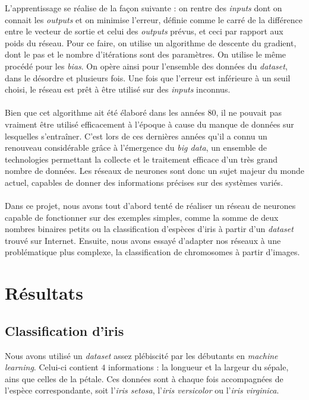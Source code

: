 \documentclass[a4paper,10pt]{article}
\begin{document}
L'apprentissage se réalise de la façon suivante : on rentre des \textit{inputs} dont on connait les \textit{outputs} et on minimise
l'erreur, définie comme le carré de la différence entre le vecteur de sortie et celui des \textit{outputs} prévus, et ceci par rapport
aux poids du réseau. Pour ce faire, on utilise un algorithme de descente du gradient, dont le pas et le nombre d'itérations 
sont des paramètres. On utilise le même procédé pour les \textit{bias}. On opère ainsi pour l'ensemble des données du \textit{dataset}, 
dans le désordre et plusieurs fois. Une fois que l'erreur est inférieure à un seuil choisi, le réseau est prêt à être utilisé 
sur des \textit{inputs} inconnus.
\\
\\
Bien que cet algorithme ait été élaboré dans les années 80, il ne pouvait pas vraiment être utilisé efficacement à l'époque à cause 
du manque de données sur lesquelles s'entraîner. C'est lors de ces dernières années qu'il a connu un renouveau considérable grâce
à l'émergence du \textit{big data}, un ensemble de technologies permettant la collecte et le traitement efficace d'un très grand nombre
de données. Les réseaux de neurones sont donc un sujet majeur du monde actuel, capables de donner des informations précises sur des systèmes variés.
\\
\\
Dans ce projet, nous avons tout d'abord tenté de réaliser un réseau de neurones capable de fonctionner sur des exemples simples, comme 
la somme de deux nombres binaires petits ou la classification d'espèces d'iris à partir d'un \textit{dataset} trouvé
sur Internet. Ensuite, nous avons essayé d'adapter nos réseaux à une problématique plus complexe, la classification de chromosomes
à partir d'images.


\section{Résultats}

\subsection{Classification d'iris}

Nous avons utilisé un \textit{dataset} assez plébiscité par les débutants en \textit{machine learning}. Celui-ci contient $4$ 
informations : la longueur et la largeur du sépale, ains que celles de la pétale. Ces données sont à chaque fois accompagnées 
de l'espèce correspondante, soit l'\textit{iris setosa}, l'\textit{iris versicolor} ou l'\textit{iris virginica}.
\end{document}
